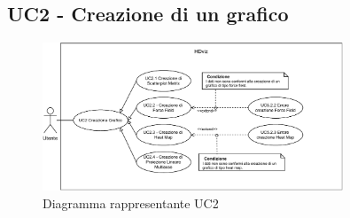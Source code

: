 \newpage

\subsection{UC2 - Creazione di un grafico}
\label{sub:uc2}

\begin{figure}[h]
    \centering
    \includegraphics[width=0.8\textwidth]{componenti/casi-duso/diagrammi/UC2.pdf}
    \caption{Diagramma rappresentante UC2}
    \label{fig:UC2}
\end{figure}


